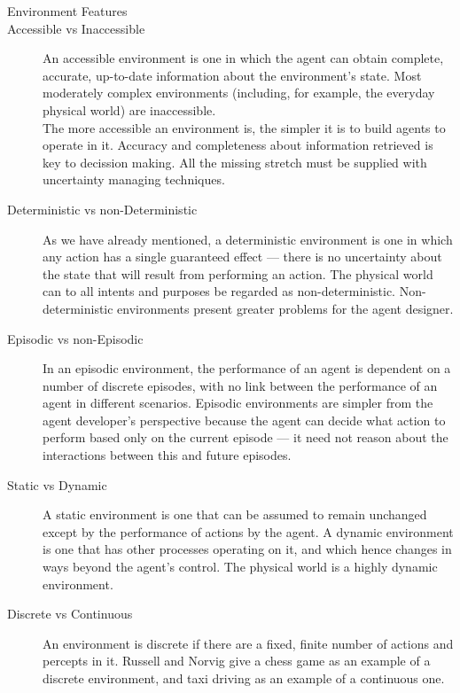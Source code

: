 \documentclass[11pt,oneside,a4paper,openright]{report}
\begin{document}


\begin{description} 
	\item [Environment Features]
	\item [Accessible vs Inaccessible] An accessible environment is one in which the agent
		can obtain complete, accurate, up-to-date information about the environment’s state.
		Most moderately complex environments (including, for example, the everyday physical 
		world) are inaccessible.\\
		The more accessible an environment is, the simpler it is to build agents to operate in it.
		Accuracy and completeness about information retrieved is key to decission making.
		All the missing stretch must be supplied with uncertainty managing techniques.
	\item [Deterministic vs non-Deterministic] As we have already mentioned, a deterministic
		environment is one in which any action has a single guaranteed effect — there is no 
		uncertainty about the state that will result from performing an action.
		The physical world can to all intents and purposes be regarded as non-deterministic.
		Non-deterministic environments present greater problems for the agent designer.
	\item [Episodic vs non-Episodic] In an episodic environment, the performance of an
		agent is dependent on a number of discrete episodes, with no link between the performance
		of an agent in different scenarios. Episodic environments are simpler from the agent
		developer’s perspective because the agent can decide what action to perform based only 
		on the current episode — it need not reason about the interactions between this and future 
		episodes.
	\item [Static vs Dynamic] A static environment is one that can be assumed to remain unchanged 
		except by the performance of actions by the agent. A dynamic environment is one that has 
		other processes operating on it, and which hence changes in ways beyond the agent’s control.
		The physical world is a highly dynamic environment.
	\item [Discrete vs Continuous] An environment is discrete if there are a fixed, finite
		number of actions and percepts in it. Russell and Norvig give a chess game as 
		an example of a discrete environment, and taxi driving as an example of a continuous one.
\end{description}
\end{document}
